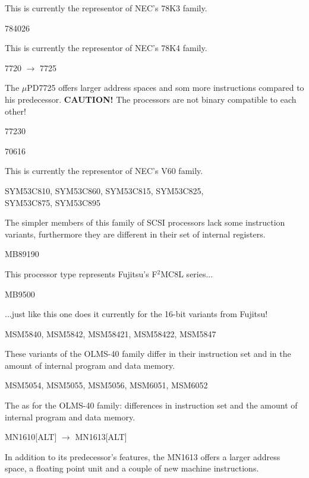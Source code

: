 \documentclass[12pt,twoside]{report}
\begin{document}
This is currently the representor of NEC's 78K3 family.
\begin{cpulist}
   784026
\end{cpulist}
This is currently the representor of NEC's 78K4 family.
\begin{cpulist}
   7720 $\rightarrow$ 7725
\end{cpulist}
The $\mu$PD7725 offers larger address spaces and som more instructions
compared to his predecessor. {\bf CAUTION!}  The processors are not binary
compatible to each other!
\begin{cpulist}
   77230
\end{cpulist}
\begin{cpulist}
   70616
\end{cpulist}
This is currently the representor of NEC's V60 family.
\begin{cpulist}
   SYM53C810, SYM53C860, SYM53C815, SYM53C825, \\
\> SYM53C875, SYM53C895
\end{cpulist}
The simpler members of this family of SCSI processors lack some
instruction variants, furthermore they are different in their set of
internal registers.
\begin{cpulist}
   MB89190
\end{cpulist}
This processor type represents Fujitsu's F$^{2}$MC8L series...
\begin{cpulist}
   MB9500
\end{cpulist}
...just like this one does it currently for the 16-bit variants from
Fujitsu!
\begin{cpulist}
   MSM5840, MSM5842, MSM58421, MSM58422, MSM5847
\end{cpulist}
These variants of the OLMS-40 family differ in their instruction
set and in the amount of internal program and data memory.
\begin{cpulist}
   MSM5054, MSM5055, MSM5056, MSM6051, MSM6052
\end{cpulist}
The as for the OLMS-40 family: differences in instruction
set and the amount of internal program and data memory.
\begin{cpulist}
   MN1610[ALT] $\rightarrow$ MN1613[ALT]
\end{cpulist}
In addition to its predecessor's features, the MN1613 offers a larger
address space, a floating point unit and a couple of new machine
instructions.
\end{document}
